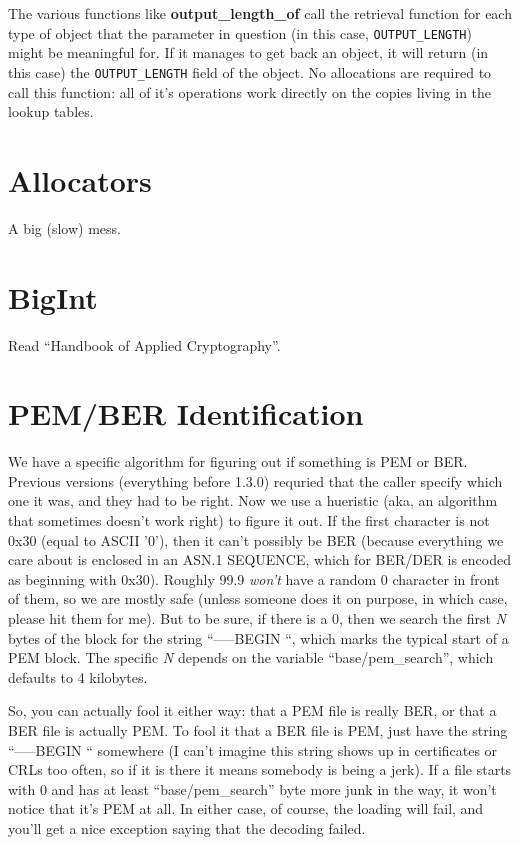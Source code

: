 \documentclass{article}
\newcommand{\function}[1]{\textbf{#1}}
\begin{document}
The various functions like \function{output\_length\_of} call the retrieval
function for each type of object that the parameter in question (in this case,
\texttt{OUTPUT\_LENGTH}) might be meaningful for. If it manages to get back an
object, it will return (in this case) the \texttt{OUTPUT\_LENGTH} field of the
object. No allocations are required to call this function: all of it's
operations work directly on the copies living in the lookup tables.

\section{Allocators}

A big (slow) mess.

\section{BigInt}

Read ``Handbook of Applied Cryptography''.

\section{PEM/BER Identification}

We have a specific algorithm for figuring out if something is PEM or
BER. Previous versions (everything before 1.3.0) requried that the caller
specify which one it was, and they had to be right. Now we use a hueristic
(aka, an algorithm that sometimes doesn't work right) to figure it out. If the
first character is not 0x30 (equal to ASCII '0'), then it can't possibly be BER
(because everything we care about is enclosed in an ASN.1 SEQUENCE, which for
BER/DER is encoded as beginning with 0x30). Roughly 99.9%
\emph{won't} have a random 0 character in front of them, so we are mostly safe
(unless someone does it on purpose, in which case, please hit them for me).
But to be sure, if there is a 0, then we search the first \emph{N} bytes of the
block for the string ``-----BEGIN ``, which marks the typical start of a PEM
block. The specific \emph{N} depends on the variable ``base/pem\_search'',
which defaults to 4 kilobytes.

So, you can actually fool it either way: that a PEM file is really BER, or that
a BER file is actually PEM. To fool it that a BER file is PEM, just have the
string ``-----BEGIN `` somewhere (I can't imagine this string shows up in
certificates or CRLs too often, so if it is there it means somebody is being a
jerk). If a file starts with 0 and has at least ``base/pem\_search'' byte more
junk in the way, it won't notice that it's PEM at all. In either case, of
course, the loading will fail, and you'll get a nice exception saying that the
decoding failed.
\end{document}
